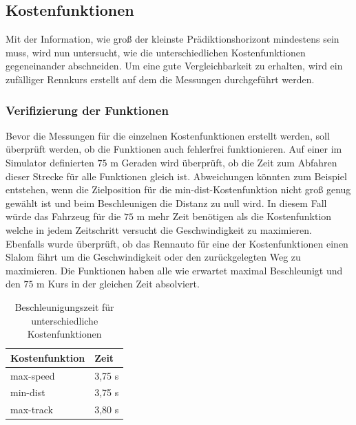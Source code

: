 \documentclass{like}
\begin{document}
\subsection{Kostenfunktionen}
Mit der Information, wie groß der kleinste Prädiktionshorizont mindestens sein muss, wird nun untersucht, wie die unterschiedlichen Kostenfunktionen gegeneinander abschneiden. Um eine gute Vergleichbarkeit zu erhalten, wird ein zufälliger Rennkurs erstellt auf dem die Messungen durchgeführt werden. 

\subsubsection{Verifizierung der Funktionen}
Bevor die Messungen für die einzelnen Kostenfunktionen erstellt werden, soll überprüft werden, ob die Funktionen auch fehlerfrei funktionieren. Auf einer im Simulator definierten $75$ m Geraden wird überprüft, ob die Zeit zum Abfahren dieser Strecke für alle Funktionen gleich ist. Abweichungen könnten zum Beispiel entstehen, wenn die Zielposition für die min-dist-Kostenfunktion nicht groß genug gewählt ist und beim Beschleunigen die Distanz zu null wird. In diesem Fall würde das Fahrzeug für die $75$ m mehr Zeit benötigen als die Kostenfunktion welche in jedem Zeitschritt versucht die Geschwindigkeit zu maximieren. Ebenfalls wurde überprüft, ob das Rennauto für eine der Kostenfunktionen einen Slalom fährt um die Geschwindigkeit oder den zurückgelegten Weg zu maximieren.
Die Funktionen haben alle wie erwartet maximal Beschleunigt und den $75$ m Kurs in der gleichen Zeit absolviert.

\begin{table}[]
	\centering
	\begin{tabular}{l|l}
		\hline
		Kostenfunktion	& Zeit  \\ \hline
		max-speed	&	3,75 s \\
		min-dist	&	3,75 s \\
		max-track	&	3,80 s \\

	\end{tabular}
	\caption{Beschleunigungszeit für unterschiedliche Kostenfunktionen}
	\label{accVerification}
\end{table}
\end{document}
